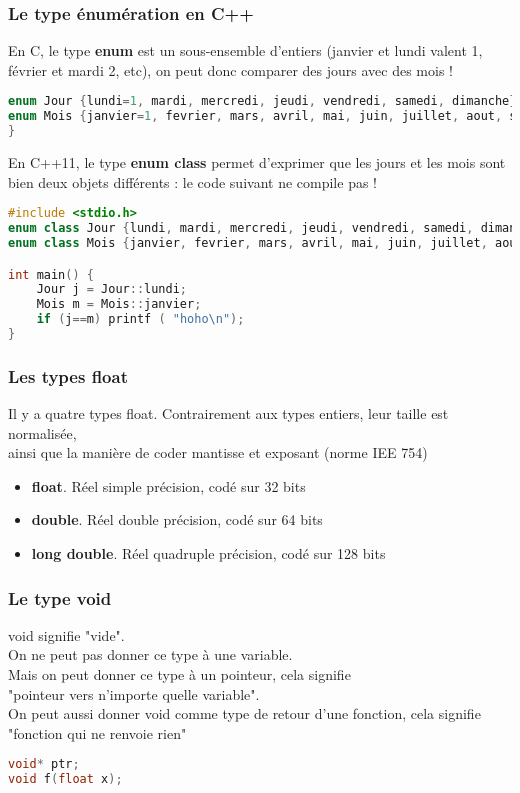 \documentclass{beamer}
\begin{document}
\begin{frame}[fragile=singleslide,shrink=20]
\frametitle {Le type énumération en C++}

En C, le type \textbf{enum} est un sous-ensemble d'entiers (janvier et lundi valent 1, février et mardi 2, etc), on peut donc comparer des jours avec des mois ! \\
\begin{lstlisting}[language=c++]
enum Jour {lundi=1, mardi, mercredi, jeudi, vendredi, samedi, dimanche};
enum Mois {janvier=1, fevrier, mars, avril, mai, juin, juillet, aout, septembre, octobre, novembre, decembre};
}
\end{lstlisting}

En C++11, le type \textbf{enum class} permet d'exprimer que les jours et les mois sont bien deux objets différents : le code suivant ne compile pas !
\begin{lstlisting}[language=c++]
#include <stdio.h>
enum class Jour {lundi, mardi, mercredi, jeudi, vendredi, samedi, dimanche};
enum class Mois {janvier, fevrier, mars, avril, mai, juin, juillet, aout, septembre, octobre, novembre, decembre};

int main() {
	Jour j = Jour::lundi;
	Mois m = Mois::janvier;
	if (j==m) printf ( "hoho\n"); 
}
\end{lstlisting}



\end{frame}


\begin{frame}[fragile=singleslide,shrink=20]
\frametitle {Les types float}
Il y a quatre types float. Contrairement aux types entiers, leur taille est normalisée, \\ 
ainsi que la manière de coder mantisse et exposant (norme IEE 754)
\begin{itemize}
\item{\textbf{float}. Réel simple précision, codé sur 32 bits}
\item{\textbf{double}. Réel double précision, codé sur 64 bits}
\item{\textbf{long double}. Réel quadruple précision, codé sur 128 bits}
\end{itemize}
\end{frame}

\begin{frame}[fragile=singleslide,shrink=20]
\frametitle {Le type void}
void signifie "vide". \\
On ne peut pas donner ce type à une variable. \\
Mais on peut donner ce type à un pointeur, cela signifie \\ "pointeur vers n'importe quelle variable". \\
On peut aussi donner void comme type de retour d'une fonction, cela signifie \\
"fonction qui ne renvoie rien"
\begin{lstlisting}[language=c++]
void* ptr;
void f(float x);
\end{lstlisting}
\end{frame}
\end{document}
